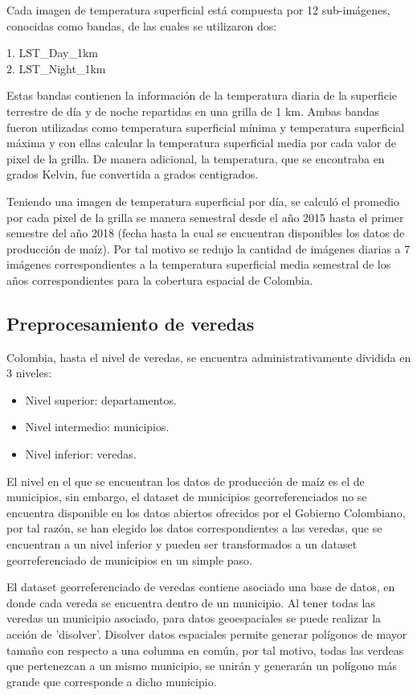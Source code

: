 \documentclass[12pt, spanish]{article}
\begin{document}
Cada imagen de temperatura superficial está compuesta por 12 sub-imágenes, conocidas como bandas, de las cuales se utilizaron dos:

1. LST\_Day\_1km \\
2. LST\_Night\_1km

Estas bandas contienen la información de la temperatura diaria de la superficie terrestre de día y de noche repartidas en una grilla de 1 km. Ambas bandas fueron utilizadas como temperatura superficial mínima y temperatura superficial máxima y con ellas calcular la temperatura superficial media por cada valor de pixel de la grilla. De manera adicional, la temperatura, que se encontraba en grados Kelvin, fue convertida a grados centigrados.

Teniendo una imagen de temperatura superficial por día, se calculó el promedio por cada pixel de la grilla se manera semestral desde el año 2015 hasta el primer semestre del año 2018 (fecha hasta la cual se encuentran disponibles los datos de producción de maíz). Por tal motivo se redujo la cantidad de imágenes diarias a 7 imágenes correspondientes a la temperatura superficial media semestral de los años correspondientes para la cobertura espacial de Colombia.

\subsection{Preprocesamiento de veredas}

Colombia, hasta el nivel de veredas, se encuentra administrativamente dividida en 3 niveles:

\begin{itemize}
    \item Nivel superior: departamentos.
    \item Nivel intermedio: municipios.
    \item Nivel inferior: veredas.
\end{itemize}

El nivel en el que se encuentran los datos de producción de maíz es el de municipios, sin embargo, el dataset de municipios georreferenciados no se encuentra disponible en los datos abiertos ofrecidos por el Gobierno Colombiano, por tal razón, se han elegido los datos correspondientes a las veredas, que se encuentran a un nivel inferior y pueden ser transformados a un dataset georreferenciado de municipios en un simple paso.

El dataset georreferenciado de veredas contiene asociado una base de datos, en donde cada vereda se encuentra dentro de un municipio. Al tener todas las veredas un municipio asociado, para datos geoespaciales se puede realizar la acción de 'disolver'. Disolver datos espaciales permite generar polígonos de mayor tamaño con respecto a una columna en común, por tal motivo, todas las verdeas que pertenezcan a un mismo municipio, se unirán y generarán un polígono más grande que corresponde a dicho municipio.
\end{document}
